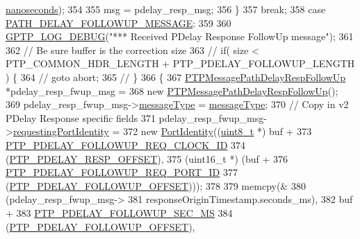 \begin{DoxyCode}
{{{{{{{{      \hyperlink{class_timestamp_a78ae11d98fcfe738239d0a853d82c84a}{nanoseconds});
354 
355             msg = pdelay\_resp\_msg;
356         \}
357         \textcolor{keywordflow}{break};
358     \textcolor{keywordflow}{case} \hyperlink{avbts__message_8hpp_ac6606ebe91c8ac66a2c314c79f5ab013adda4323fc121fba997bb5aa704a9dde8}{PATH\_DELAY\_FOLLOWUP\_MESSAGE}:
359 
360         \hyperlink{gptp__log_8hpp_ae4c6efe7c9cf6d7d3bbd28a0fd087d61}{GPTP\_LOG\_DEBUG}(\textcolor{stringliteral}{"*** Received PDelay Response FollowUp message"});
361 
362         \textcolor{comment}{// Be sure buffer is the correction size}
363 \textcolor{comment}{//     if( size < PTP\_COMMON\_HDR\_LENGTH + PTP\_PDELAY\_FOLLOWUP\_LENGTH ) \{}
364 \textcolor{comment}{//       goto abort;}
365 \textcolor{comment}{//     \}}
366         \{
367             \hyperlink{class_p_t_p_message_path_delay_resp_follow_up}{PTPMessagePathDelayRespFollowUp} *pdelay\_resp\_fwup\_msg =
368                 \textcolor{keyword}{new} \hyperlink{class_p_t_p_message_path_delay_resp_follow_up}{PTPMessagePathDelayRespFollowUp}();
369             pdelay\_resp\_fwup\_msg->\hyperlink{class_p_t_p_message_common_adb32627aa5b0e2dbad3ccd88aab07c05}{messageType} = \hyperlink{class_p_t_p_message_common_adb32627aa5b0e2dbad3ccd88aab07c05}{messageType};
370             \textcolor{comment}{// Copy in v2 PDelay Response specific fields}
371             pdelay\_resp\_fwup\_msg->\hyperlink{class_p_t_p_message_path_delay_resp_follow_up_a27e69c7fb521ebffca13229a7c4658ce}{requestingPortIdentity} =
372                 \textcolor{keyword}{new} \hyperlink{class_port_identity}{PortIdentity}((\hyperlink{stdint_8h_aba7bc1797add20fe3efdf37ced1182c5}{uint8\_t} *) buf +
373                          \hyperlink{avbts__message_8hpp_a888c4d23c6d7221b962cdb21af1c9919}{PTP\_PDELAY\_FOLLOWUP\_REQ\_CLOCK\_ID}
374                          (\hyperlink{avbts__message_8hpp_a7c20f0e32d4408c124fa9e115ab32cf3}{PTP\_PDELAY\_RESP\_OFFSET}),
375                          (uint16\_t *) (buf +
376                                \hyperlink{avbts__message_8hpp_a255d563aa29bae40a58b1855d33155fc}{PTP\_PDELAY\_FOLLOWUP\_REQ\_PORT\_ID}
377                                (\hyperlink{avbts__message_8hpp_af0f41aa83b1011ea5b8c42abddd8cd50}{PTP\_PDELAY\_FOLLOWUP\_OFFSET})));
378 
379             memcpy(&
380                    (pdelay\_resp\_fwup\_msg->
381                 responseOriginTimestamp.seconds\_ms),
382                    buf +
383                    \hyperlink{avbts__message_8hpp_a64120f45af2cdc57df2a73e8867ec2dd}{PTP\_PDELAY\_FOLLOWUP\_SEC\_MS}
384                    (\hyperlink{avbts__message_8hpp_af0f41aa83b1011ea5b8c42abddd8cd50}{PTP\_PDELAY\_FOLLOWUP\_OFFSET}),
}}}}}}}}
\end{DoxyCode}
